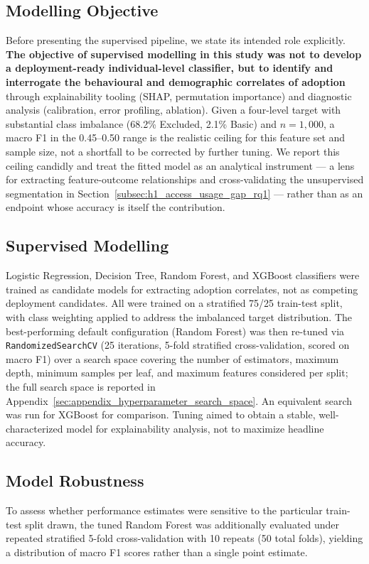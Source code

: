 \documentclass[conference]{IEEEtran}
\begin{document}
\subsection{Modelling Objective}
\label{subsec:modelling_objective}

Before presenting the supervised pipeline, we state its intended role
explicitly. \textbf{The objective of supervised modelling in this study
was not to develop a deployment-ready individual-level classifier, but to
identify and interrogate the behavioural and demographic correlates of
adoption} through explainability tooling (SHAP, permutation importance)
and diagnostic analysis (calibration, error profiling, ablation). Given a
four-level target with substantial class imbalance (68.2\% Excluded,
2.1\% Basic) and $n=1{,}000$, a macro F1 in the 0.45--0.50 range is the
realistic ceiling for this feature set and sample size, not a shortfall to
be corrected by further tuning. We report this ceiling candidly and treat
the fitted model as an analytical instrument --- a lens for extracting
feature-outcome relationships and cross-validating the unsupervised
segmentation in Section~\ref{subsec:h1_access_usage_gap_rq1} --- rather than as an endpoint whose accuracy
is itself the contribution.

\subsection{Supervised Modelling}
\label{subsec:supervised_modelling}

Logistic Regression, Decision Tree, Random Forest, and XGBoost classifiers
were trained as candidate models for extracting adoption correlates, not
as competing deployment candidates. All were trained on a stratified
75/25 train-test split, with class weighting applied to address the
imbalanced target distribution. The best-performing default configuration
(Random Forest) was then re-tuned via \texttt{RandomizedSearchCV} (25
iterations, 5-fold stratified cross-validation, scored on macro F1) over a
search space covering the number of estimators, maximum depth, minimum
samples per leaf, and maximum features considered per split; the full
search space is reported in Appendix~\ref{sec:appendix_hyperparameter_search_space}. An equivalent search was run for
XGBoost for comparison. Tuning aimed to obtain a stable, well-characterized
model for explainability analysis, not to maximize headline accuracy.

\subsection{Model Robustness}
\label{subsec:model_robustness_methods}
To assess whether performance estimates were sensitive to the particular train-test split drawn, the tuned Random Forest was additionally evaluated under repeated stratified 5-fold cross-validation with 10 repeats (50 total folds), yielding a distribution of macro F1 scores rather than a single point estimate.
 
\end{document}
